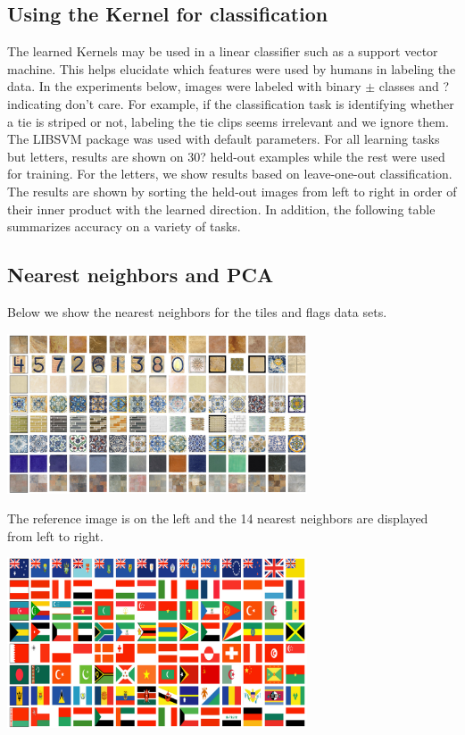 \documentclass{article}
\begin{document}
\subsection{Using the Kernel for classification}

The learned Kernels may be used in a linear classifier such as a support vector machine.  This helps elucidate which features were used by humans in labeling the data.  In the experiments below, images were labeled with binary $\pm$ classes and ? indicating don't care.  For example, if the classification task is identifying whether a tie is striped or not, labeling the tie clips seems irrelevant and we ignore them.  The LIBSVM \cite{CC01} package was used with default parameters.  For all learning tasks but letters, results are shown on 30? held-out examples while the rest were used for training.  For the letters, we show results based on leave-one-out classification.  The results are shown by sorting the held-out images from left to right in order of their inner product with the learned direction.  In addition, the following table summarizes accuracy on a variety of tasks.

\subsection{Nearest neighbors and PCA}
Below we show the nearest neighbors for the tiles and flags data sets.

{\center \includegraphics[width=3.5in]{tiles_neighs.pdf}}

The reference image is on the left and the 14 nearest neighbors are displayed from left to right.

{\center \includegraphics[width=3.5in]{flags_neighs.pdf}}
\end{document}
